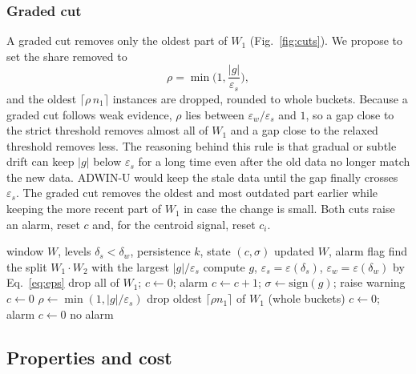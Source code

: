 \documentclass[conference]{IEEEtran}
\begin{document}
\subsubsection{Graded cut}
A graded cut removes only the oldest part of $W_1$ (Fig.~\ref{fig:cuts}). We propose to set the share removed to
\begin{equation}
\rho=\min\!\Big(1,\frac{|g|}{\varepsilon_s}\Big),
\label{eq:rho}
\end{equation}
and the oldest $\lceil\rho\, n_1\rceil$ instances are dropped, rounded to whole buckets. Because a graded cut follows weak evidence, $\rho$ lies between $\varepsilon_w/\varepsilon_s$ and $1$, so a gap close to the strict threshold removes almost all of $W_1$ and a gap close to the relaxed threshold removes less. The reasoning behind this rule is that gradual or subtle drift can keep $|g|$ below $\varepsilon_s$ for a long time even after the old data no longer match the new data. ADWIN-U would keep the stale data until the gap finally crosses $\varepsilon_s$. The graded cut removes the oldest and most outdated part earlier while keeping the more recent part of $W_1$ in case the change is small. Both cuts raise an alarm, reset $c$ and, for the centroid signal, reset $c_i$.

\begin{algorithm}[htbp]
\caption{Window-selection policy (one check)}
\label{alg:policy}
\small
\begin{algorithmic}[1]
\Require window $W$, levels $\delta_s<\delta_w$, persistence $k$, state $(c,\sigma)$
\Ensure updated $W$, alarm flag
\State find the split $W_1\cdot W_2$ with the largest $|g|/\varepsilon_s$
\State compute $g$, $\varepsilon_s=\varepsilon(\delta_s)$, $\varepsilon_w=\varepsilon(\delta_w)$ by Eq.~\eqref{eq:eps}
  \State drop all of $W_1$; $c\gets0$; \Return alarm
    \State $c\gets c+1$; $\sigma\gets\mathrm{sign}(g)$; raise warning
  \Else
    \State $c\gets0$ 
  \EndIf
    \State $\rho\gets\min(1,|g|/\varepsilon_s)$
    \State drop oldest $\lceil\rho n_1\rceil$ of $W_1$ (whole buckets)
    \State $c\gets0$; \Return alarm
  \EndIf
\Else
  \State $c\gets0$ 
\EndIf
\State \Return no alarm
\end{algorithmic}
\end{algorithm}

\subsection{Properties and cost}
\end{document}
